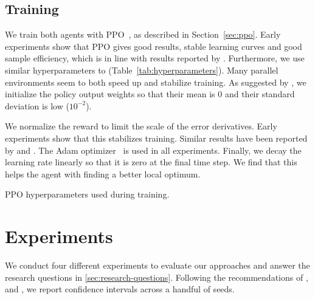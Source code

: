 
\subsection{Training}

We train both agents with PPO~\cite{schulman_ppo_2017}, as described in Section~\ref{sec:ppo}.
Early experiments show that PPO gives good results, stable learning curves and good sample efficiency, which is in line with results reported by \cite{andrychowicz_empirical_2020}.
Furthermore, we use similar hyperparameters to \cite{cobbe_procgen_2020} (Table~\ref{tab:hyperparameters}).
Many parallel environments seem to both speed up and stabilize training. 
As suggested by \cite{andrychowicz_empirical_2020}, we initialize the policy output weights so that their mean is 0 and their standard deviation is low (\(10^{-2}\)).

We normalize the reward to limit the scale of the error derivatives.
Early experiments show that this stabilizes training.
Similar results have been reported by \cite{andrychowicz_empirical_2020} and \cite{mnih_atari_2013}.
The Adam optimizer~\cite{kingma_ba_2017} is used in all experiments.
Finally, we decay the learning rate linearly so that it is zero at the final time step.
We find that this helps the agent with finding a better local optimum.

\begin{table}
    \centering
    \caption[PPO hyperparamters]{PPO hyperparameters used during training.}
    
    \label{tab:hyperparameters}
\end{table}

\section{Experiments}
\label{sec:experiments}

We conduct four different experiments to evaluate our approaches and answer the research questions in \ref{sec:research-questions}. 
Following the recommendations of \cite{henderson_matters_2018}, \cite{colas_hitchhiker_2019} and \cite{agarwal_rlliable_2022}, we report confidence intervals across a handful of seeds.

